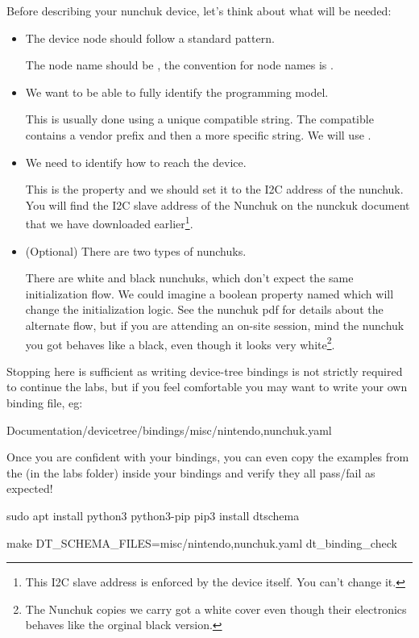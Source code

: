 Before describing your nunchuk device, let's think about what will be
needed:
\begin{itemize}
\item The device node should follow a standard pattern.

  The node name should be , the convention for node
  names is .

\item We want to be able to fully identify the programming model.

  This is usually done using a unique compatible string. The compatible
  contains a vendor prefix and then a more specific string. We will use
  .

\item We need to identify how to reach the device.

  This is the  property and we should set it to the I2C
  address of the nunchuk. You will find the I2C slave address of the
  Nunchuk on the nunckuk document that we have downloaded
  earlier\footnote{This I2C slave address is enforced by the device
    itself. You can't change it.}.

\item (Optional) There are two types of nunchuks.

  There are white and black nunchuks, which don't expect the same
  initialization flow. We could imagine a boolean property named
   which will change the initialization
  logic. See the nunchuk pdf for details about the alternate flow, but if you
  are attending an on-site session, mind the nunchuk you got behaves like a
  black, even though it looks very white\footnote{The Nunchuk copies we
  carry got a white cover even though their electronics behaves like the
  orginal black version.}.

\end{itemize}

Stopping here is sufficient as writing device-tree bindings is not
strictly required to continue the labs, but if you feel comfortable
you may want to write your own binding file, eg:
\begin{bashinput}
Documentation/devicetree/bindings/misc/nintendo,nunchuk.yaml
\end{bashinput}
Once you are confident with your bindings, you can even copy the
examples from the  (in the
 labs folder) inside your bindings and verify they all
pass/fail as expected!
\begin{bashinput}
sudo apt install python3 python3-pip
pip3 install dtschema

make DT_SCHEMA_FILES=misc/nintendo,nunchuk.yaml dt_binding_check
\end{bashinput}

